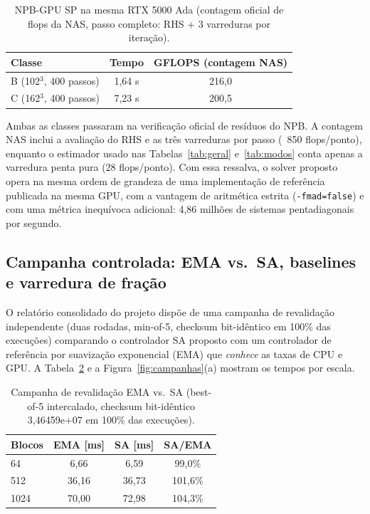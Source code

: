 \documentclass[12pt]{article}
\begin{document}
\begin{table}[ht]
\centering
\caption{NPB-GPU SP na mesma RTX 5000 Ada (contagem oficial de flops da NAS,
  passo completo: RHS + 3 varreduras por iteração).}
\label{tab:npb}
\begin{tabular}{lcc}
\toprule
\textbf{Classe} & \textbf{Tempo} & \textbf{GFLOPS (contagem NAS)} \\
\midrule
B (102$^3$, 400 passos) & 1,64 s & 216,0 \\
C (162$^3$, 400 passos) & 7,23 s & 200,5 \\
\bottomrule
\end{tabular}
\end{table}

Ambas as classes passaram na verificação oficial de resíduos do NPB. A
contagem NAS inclui a avaliação do RHS e as três varreduras por passo
(~850 flops/ponto), enquanto o estimador usado nas Tabelas~\ref{tab:geral}
e~\ref{tab:modos} conta apenas a varredura penta pura (28 flops/ponto).
Com essa ressalva, o solver proposto opera na mesma ordem de grandeza de
uma implementação de referência publicada na mesma GPU, com a vantagem de
aritmética estrita (\texttt{-fmad=false}) e com uma métrica inequívoca
adicional: 4,86 milhões de sistemas pentadiagonais por segundo.

\subsection{Campanha controlada: EMA vs.\ SA, baselines e varredura de fração}
\label{sec:campanha}

O relatório consolidado do projeto dispõe de uma campanha de revalidação
independente (duas rodadas, min-of-5, checksum bit-idêntico em 100\% das
execuções) comparando o controlador SA proposto com um controlador de
referência por suavização exponencial (EMA) que \emph{conhece} as taxas de
CPU e GPU. A Tabela~\ref{tab:campanha} e a
Figura~\ref{fig:campanhas}(a) mostram os tempos por escala.

\begin{table}[ht]
\centering
\caption{Campanha de revalidação EMA vs.\ SA (best-of-5 intercalado,
  checksum bit-idêntico 3,46459e+07 em 100\% das execuções).}
\label{tab:campanha}
\begin{tabular}{lccc}
\toprule
\textbf{Blocos} & \textbf{EMA [ms]} & \textbf{SA [ms]} & \textbf{SA/EMA} \\
\midrule
64   & 6,66 & 6,59 & 99,0\% \\
512  & 36,16 & 36,73 & 101,6\% \\
1024 & 70,00 & 72,98 & 104,3\% \\
\bottomrule
\end{tabular}
\end{table}
\end{document}
